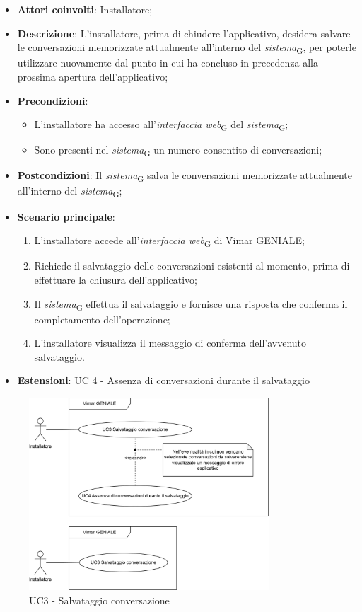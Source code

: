 \begin{itemize}
    \item \textbf{Attori coinvolti}: Installatore;
    \item \textbf{Descrizione}: L’installatore, prima di chiudere l’applicativo, desidera salvare le conversazioni memorizzate attualmente all’interno del \textit{sistema}\textsubscript{G}, per poterle utilizzare nuovamente dal punto in cui ha concluso in precedenza alla prossima apertura dell’applicativo;
    \item \textbf{Precondizioni}: 
        \begin{itemize}
            \item L’installatore ha accesso all’\textit{interfaccia web}\textsubscript{G} del \textit{sistema}\textsubscript{G};
            \item Sono presenti nel \textit{sistema}\textsubscript{G} un numero consentito di conversazioni;
        \end{itemize}
    \item \textbf{Postcondizioni}: Il \textit{sistema}\textsubscript{G} salva le conversazioni memorizzate attualmente all’interno del \textit{sistema}\textsubscript{G};
    \item \textbf{Scenario principale}:
    \begin{enumerate}
    \item L’installatore accede all’\textit{interfaccia web}\textsubscript{G} di Vimar GENIALE;
    \item Richiede il salvataggio delle conversazioni esistenti al momento, prima di effettuare la chiusura dell’applicativo;
    \item Il \textit{sistema}\textsubscript{G} effettua il salvataggio e fornisce una risposta che conferma il completamento dell’operazione;
    \item L’installatore visualizza il messaggio di conferma dell’avvenuto salvataggio.
    \end{enumerate}
    \item \textbf{Estensioni}: UC 4 - Assenza di conversazioni durante il salvataggio
\end{itemize}
\begin{figure}[H]
\centering
\includegraphics[width=0.8\textwidth]{contents/casi_duso/png/UC3.png}
\caption{UC3 - Salvataggio conversazione}
\end{figure}

